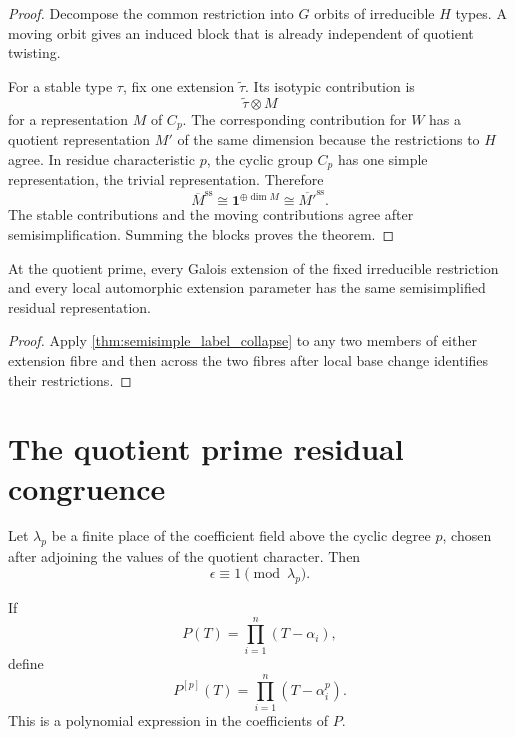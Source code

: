 \documentclass{aomart}
\theoremstyle{definition}
\theoremstyle{remark}
\newcommand{\one}{\mathbf 1}
\begin{document}
\begin{proof}
Decompose the common restriction into \(G\) orbits of irreducible \(H\) types. A moving orbit gives an induced block that is already independent of quotient twisting.

For a stable type \(\tau\), fix one extension \(\widetilde\tau\). Its isotypic contribution is
\[
 \widetilde\tau\otimes M
\]
for a representation \(M\) of \(C_p\). The corresponding contribution for \(W\) has a quotient representation \(M'\) of the same dimension because the restrictions to \(H\) agree. In residue characteristic \(p\), the cyclic group \(C_p\) has one simple representation, the trivial representation. Therefore
\[
 \overline M^{\mathrm{ss}}
 \cong
 \one^{\oplus\dim M}
 \cong
 \overline {M'}^{\mathrm{ss}}.
\]
The stable contributions and the moving contributions agree after semisimplification. Summing the blocks proves the theorem.
\end{proof}

\begin{corollary}\label{cor:two_torsor_residual_collapse}
At the quotient prime, every Galois extension of the fixed irreducible restriction and every local automorphic extension parameter has the same semisimplified residual representation.
\end{corollary}

\begin{proof}
Apply \cref{thm:semisimple_label_collapse} to any two members of either extension fibre and then across the two fibres after local base change identifies their restrictions.
\end{proof}

\section{The quotient prime residual congruence}\label{sec:quotient_prime}

Let \(\lambda_p\) be a finite place of the coefficient field above the cyclic degree \(p\), chosen after adjoining the values of the quotient character. Then
\[
\epsilon\equiv1\pmod{\lambda_p}.
\]

\begin{definition}\label{def:frobenius_transform}
If
\[
P(T)=\prod_{i=1}^{n}(T-\alpha_i),
\]
define
\[
P^{[p]}(T)
=
\prod_{i=1}^{n}(T-\alpha_i^p).
\]
This is a polynomial expression in the coefficients of \(P\).
\end{definition}
\end{document}
